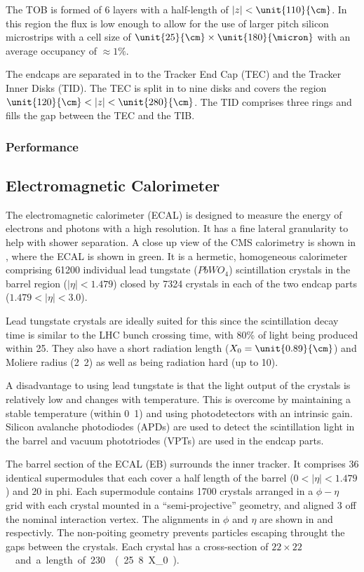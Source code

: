 The TOB is formed of 6 layers with a half-length of $|z| < \unit{110}{\cm}$. In
this region the flux is low enough to allow for the use of larger pitch
silicon microstrips with a cell size of
$\unit{25}{\cm}\times\unit{180}{\micron}$ with an average occupancy of
$\approx\unit{1}{\%}$.

The endcaps are separated in to the Tracker End Cap (TEC) and the Tracker Inner
Disks (TID). The TEC is split in to nine disks and covers the region
$\unit{120}{\cm} < |z| < \unit{280}{\cm}$. The TID comprises three rings
and fills the gap between the TEC and the TIB.

\subsubsection{Performance}

\subsection{Electromagnetic Calorimeter}
The electromagnetic calorimeter (ECAL) is designed to measure the energy of
electrons and photons with a high resolution.  It has a fine lateral granularity
to help with shower separation.  A close up view of the CMS calorimetry is shown
in , where the ECAL is shown in green.  It is a hermetic,
homogeneous calorimeter comprising 61200 individual lead tungstate ($PbWO_{4}$)
scintillation crystals in the barrel region ($|\eta|<1.479$) closed by 7324
crystals in each of the two endcap parts ($1.479<|\eta|<3.0$).

Lead tungstate crystals are ideally suited for this since the scintillation
decay time is similar to the LHC bunch crossing time, 
with \unit{80}{\%} of light being produced within \unit{25}{\ns}.
They also have a short radiation length ($X_0=\unit{0.89}{\cm}$) 
and Moliere radius (\unit{2.2}{\cm}) as well as being radiation hard
(up to \unit{10}{\mrad}).

A disadvantage to using lead tungstate is that the light output of the crystals
is relatively low and changes with temperature. This is overcome by maintaining
a stable temperature (within \unit{0.1}{\degreecelsius}) and using
photodetectors with an intrinsic gain.
Silicon avalanche photodiodes (APDs) are used to detect the scintillation light
in the barrel and vacuum phototriodes (VPTs) are used in the endcap parts.

The barrel section of the ECAL (EB) surrounds the inner tracker. It comprises
36 identical supermodules that each cover a half length of the barrel
($0<|\eta|<1.479$) and \unit{20}{\degree} in phi. Each supermodule contains
1700 crystals arranged in a $\phi - \eta$ grid with each crystal mounted in a
``semi-projective'' geometry, and aligned \unit{3}{\degree} off the
nominal interaction vertex.
The alignments in $\phi$ and $\eta$ are shown in  and
 respectivly. The non-poiting geometry 
 prevents particles escaping throught the gaps between the crystals.
Each crystal has a cross-section of
\unit{$22 \times 22$}{\mm\squared} and a length of
\unit{230}{\mm} (\unit{25.8}{X_0}).

